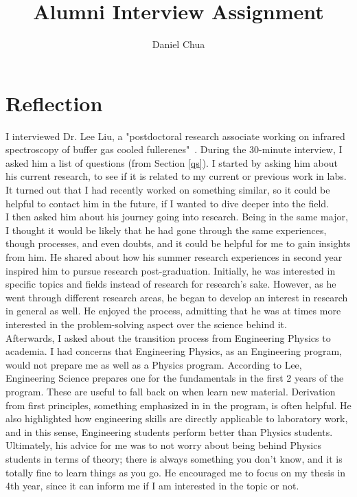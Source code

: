 \documentclass[12pt]{article}
\title{Alumni Interview Assignment}
\author{Daniel Chua}
\begin{document}
\maketitle

\section{Reflection}
I interviewed Dr. Lee Liu, a "postdoctoral research associate working on infrared spectroscopy of buffer gas cooled fullerenes"~\cite{lee}. During the 30-minute interview, I asked him a list of questions (from Section \ref{qs}). I started by asking him about his current research, to see if it is related to my current or previous work in labs. It turned out that I had recently worked on something similar, so it could be helpful to contact him in the future, if I wanted to dive deeper into the field. \\
I then asked him about his journey going into research. Being in the same major, I thought it would be likely that he had gone through the same experiences, though processes, and even doubts, and it could be helpful for me to gain insights from him. He shared about how his summer research experiences in second year inspired him to pursue research post-graduation. Initially, he was interested in specific topics and fields instead of research for research's sake. However, as he went through different research areas, he began to develop an interest in research in general as well. He enjoyed the process, admitting that he was at times more interested in the problem-solving aspect over the science behind it. \\
Afterwards, I asked about the transition process from Engineering Physics to academia. I had concerns that Engineering Physics, as an Engineering program, would not prepare me as well as a Physics program. According to Lee, Engineering Science prepares one for the fundamentals in the first 2 years of the program. These are useful to fall back on when learn new material. Derivation from first principles, something emphasized in in the program, is often helpful. He also highlighted how engineering skills are directly applicable to laboratory work, and in this sense, Engineering students perform better than Physics students. Ultimately, his advice for me was to not worry about being behind Physics students in terms of theory; there is always something you don't know, and it is totally fine to learn things as you go. He encouraged me to focus on my thesis in 4th year, since it can inform me if I am interested in the topic or not. \\
\end{document}
